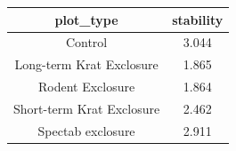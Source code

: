 \documentclass[]{article}
\begin{document}
\begin{longtable}[]{@{}cc@{}}
\toprule
\begin{minipage}[b]{0.34\columnwidth}\centering\strut
plot\_type\strut
\end{minipage} & \begin{minipage}[b]{0.14\columnwidth}\centering\strut
stability\strut
\end{minipage}\tabularnewline
\midrule
\endhead
\begin{minipage}[t]{0.34\columnwidth}\centering\strut
Control\strut
\end{minipage} & \begin{minipage}[t]{0.14\columnwidth}\centering\strut
3.044\strut
\end{minipage}\tabularnewline
\begin{minipage}[t]{0.34\columnwidth}\centering\strut
Long-term Krat Exclosure\strut
\end{minipage} & \begin{minipage}[t]{0.14\columnwidth}\centering\strut
1.865\strut
\end{minipage}\tabularnewline
\begin{minipage}[t]{0.34\columnwidth}\centering\strut
Rodent Exclosure\strut
\end{minipage} & \begin{minipage}[t]{0.14\columnwidth}\centering\strut
1.864\strut
\end{minipage}\tabularnewline
\begin{minipage}[t]{0.34\columnwidth}\centering\strut
Short-term Krat Exclosure\strut
\end{minipage} & \begin{minipage}[t]{0.14\columnwidth}\centering\strut
2.462\strut
\end{minipage}\tabularnewline
\begin{minipage}[t]{0.34\columnwidth}\centering\strut
Spectab exclosure\strut
\end{minipage} & \begin{minipage}[t]{0.14\columnwidth}\centering\strut
2.911\strut
\end{minipage}\tabularnewline
\bottomrule
\end{longtable}
\end{document}
